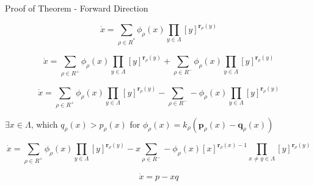 \begin{frame}{Proof of Theorem - Forward Direction}
    
    	\[\dot x = \sum_{\rho \in R^*} \phi_{\rho}(x) \prod_{y \in \Lambda} [y]^{\textbf{r}_{\rho}(y)}\]
        
        \[\dot x = \sum_{\rho \in R^+} \phi_{\rho}(x) \prod_{y \in \Lambda} [y]^{\textbf{r}_{\rho}(y)} + \sum_{\rho \in R^-} \phi_{\rho}(x) \prod_{y \in \Lambda} [y]^{\textbf{r}_{\rho}(y)}\]
        
        \[\dot x = \sum_{\rho \in R^+} \phi_{\rho}(x) \prod_{y \in \Lambda} [y]^{\textbf{r}_{\rho}(y)} - \sum_{\rho \in R^-} -\phi_{\rho}(x) \prod_{y \in \Lambda} [y]^{\textbf{r}_{\rho}(y)}\]
        
        \begin{center} \(\exists x \in \Lambda\), which \(q_{\rho}(x) > p_{\rho}(x)\) for \(\phi_{\rho}(x) = k_{\rho}(\textbf{p}_{\rho}(x) - \textbf{q}_{\rho}(x))\) \end{center}   
        
        
        \[\dot x = \sum_{\rho \in R^+} \phi_{\rho}(x) \prod_{y \in \Lambda} [y]^{\textbf{r}_{\rho}(y)} - x\sum_{\rho \in R^-} -\phi_{\rho}(x) [x]^{\textbf{r}_{\rho}(x)-1} \prod_{x \neq y \in \Lambda} [y]^{\textbf{r}_{\rho}(y)}\]
        
        \[\dot x = p - xq\]
    
\end{frame}
